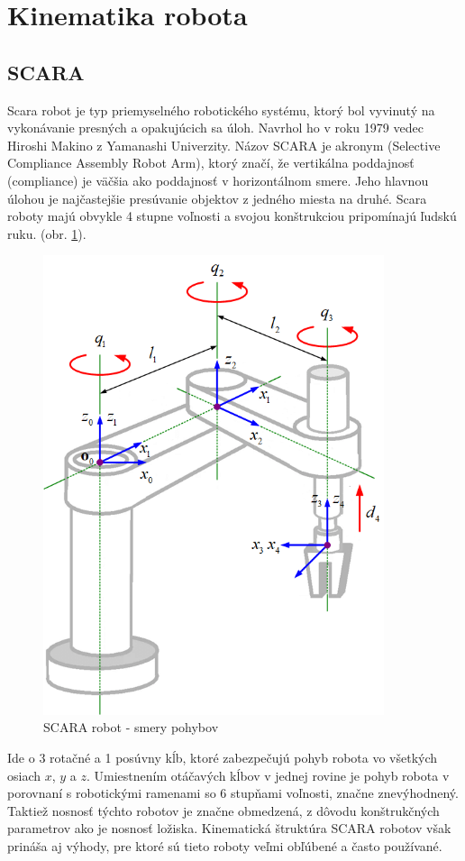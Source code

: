 
\section{Kinematika robota}
\label{kap:1}

\subsection{SCARA}
\label{kap:1.1}

Scara robot je typ priemyselného robotického systému, ktorý bol vyvinutý na vykonávanie presných a opakujúcich sa úloh. Navrhol ho v roku 1979 vedec Hiroshi Makino z Yamanashi Univerzity\cite{}. Názov SCARA je akronym (Selective Compliance Assembly Robot Arm), ktorý značí, že vertikálna poddajnosť (compliance) je väčšia ako poddajnosť v horizontálnom smere. Jeho hlavnou úlohou je najčastejšie presúvanie objektov z jedného miesta na druhé. Scara roboty majú obvykle 4 stupne voľnosti a svojou konštrukciou pripomínajú ľudskú ruku. (obr. \ref{OBRAZOK 1.1}).
\begin{figure}[h]
	\centering
	\includegraphics[width=100mm]{img/SCARA-robot-manipulator.png}
	\caption{SCARA robot - smery pohybov\cite{}}\label{OBRAZOK 1.1} 
\end{figure} 
Ide o 3 rotačné a 1 posúvny kĺb, ktoré zabezpečujú pohyb robota vo všetkých osiach $x$, $y$ a $z$. Umiestnením otáčavých kĺbov v jednej rovine je pohyb robota v porovnaní s robotickými ramenami so 6 stupňami voľnosti, značne znevýhodnený. Taktiež nosnosť týchto robotov je značne obmedzená, z dôvodu konštrukčných parametrov ako je nosnosť ložiska. Kinematická štruktúra SCARA robotov však prináša aj výhody, pre ktoré sú tieto roboty veľmi obľúbené a často používané.

